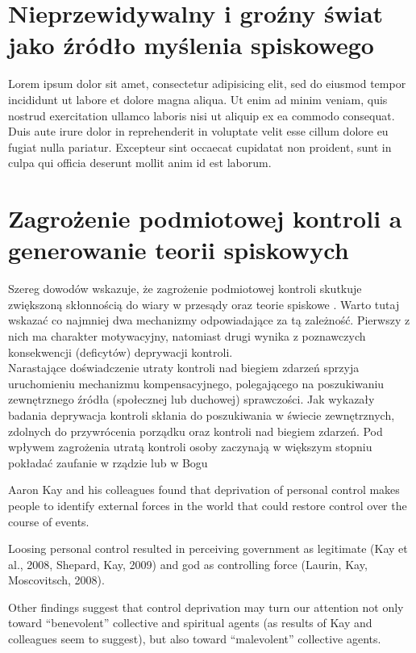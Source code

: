\documentclass[man]{apa6}
\begin{document}
    \section{Nieprzewidywalny i groźny świat jako źródło myślenia spiskowego}

    Lorem ipsum dolor sit amet, consectetur adipisicing elit, sed do eiusmod tempor incididunt ut labore et dolore magna aliqua. Ut enim ad minim veniam, quis nostrud exercitation ullamco laboris nisi ut aliquip ex ea commodo consequat. Duis aute irure dolor in reprehenderit in voluptate velit esse cillum dolore eu fugiat nulla pariatur. Excepteur sint occaecat cupidatat non proident, sunt in culpa qui officia deserunt mollit anim id est laborum.

    \section{Zagrożenie podmiotowej kontroli a generowanie teorii spiskowych}

    Szereg dowodów wskazuje, że zagrożenie podmiotowej kontroli skutkuje zwiększoną skłonnością do wiary w przesądy oraz teorie spiskowe \parencite{whitson2008lacking}. Warto tutaj wskazać co najmniej dwa mechanizmy odpowiadające za tą zależność. Pierwszy z nich ma charakter motywacyjny, natomiast drugi wynika z poznawczych konsekwencji (deficytów) deprywacji kontroli.\\

    Narastające doświadczenie utraty kontroli nad biegiem zdarzeń sprzyja uruchomieniu mechanizmu kompensacyjnego, polegającego na poszukiwaniu zewnętrznego źródła (społecznej lub duchowej) sprawczości. Jak wykazały badania \textcite{kay2008god} deprywacja kontroli skłania do poszukiwania w świecie zewnętrznych, zdolnych do przywrócenia porządku oraz kontroli nad biegiem zdarzeń. Pod wpływem zagrożenia utratą kontroli osoby zaczynają w większym stopniu pokładać zaufanie w rządzie lub w Bogu 

Aaron Kay and his colleagues found that deprivation of personal control makes people to identify external forces in the world that could restore control over the course of events. 

Loosing personal control resulted in perceiving government as legitimate (Kay et al., 2008, Shepard, Kay, 2009) and god as controlling force (Laurin, Kay, Moscovitsch, 2008). 

Other findings suggest that control deprivation may turn our attention not only toward ``benevolent'' collective and spiritual agents (as results of Kay and colleagues seem to suggest), but also toward ``malevolent'' collective agents.
\end{document}
